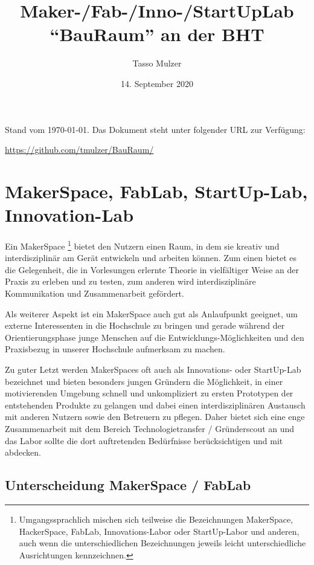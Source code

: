\documentclass[parskip=half,headsepline,footsepline,titlepage]{scrartcl}
\title{Maker-/Fab-/Inno-/StartUpLab ``BauRaum'' an der BHT}
\author{Tasso Mulzer}
\begin{document}
 
\date{14. September 2020}
\maketitle
\doclicenseThis


\pagestyle{empty}
Stand vom \today. Das Dokument steht unter folgender URL zur Verfügung:

\url{https://github.com/tmulzer/BauRaum/}
\tableofcontents
\cleardoubleoddpage

\pagestyle{plain}

\section{MakerSpace, FabLab, StartUp-Lab, Innovation-Lab}
Ein MakerSpace \footnote{Umgangssprachlich mischen sich teilweise die Bezeichnungen MakerSpace, HackerSpace, FabLab, Innovations-Labor oder StartUp-Labor und anderen, auch wenn die unterschiedlichen Bezeichnungen jeweils leicht unterschiedliche Ausrichtungen kennzeichnen.} bietet den Nutzern einen Raum, in dem sie kreativ und interdisziplinär am Gerät entwickeln und arbeiten können.
Zum einen bietet es die Gelegenheit, die in Vorlesungen erlernte Theorie in vielfältiger Weise an der Praxis zu erleben und zu testen, zum anderen wird interdisziplinäre Kommunikation und Zusammenarbeit gefördert.

Als weiterer Aspekt ist ein MakerSpace auch gut als Anlaufpunkt geeignet, um externe Interessenten in die Hochschule zu bringen und gerade während der Orientierungsphase junge Menschen auf die Entwicklungs-Möglichkeiten und den Praxisbezug in unserer Hochschule aufmerksam zu machen.

Zu guter Letzt werden MakerSpaces oft auch als Innovations- oder StartUp-Lab bezeichnet und bieten besonders jungen Gründern die Möglichkeit, in einer motivierenden Umgebung schnell und unkompliziert zu ersten Prototypen der entstehenden Produkte zu gelangen und dabei einen interdisziplinären Austausch mit anderen Nutzern sowie den Betreuern zu pflegen. Daher bietet sich eine enge Zusammenarbeit mit dem Bereich Technologietransfer / Gründerscout an und das Labor sollte die dort auftretenden Bedürfnisse berücksichtigen und mit abdecken.

\subsection{Unterscheidung MakerSpace / FabLab}
\end{document}

